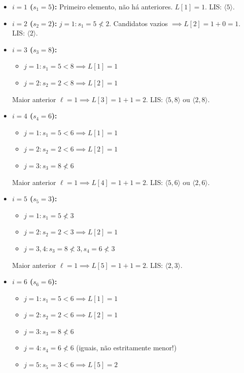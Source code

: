 \documentclass[11pt,a4paper]{article}
\begin{document}
\begin{itemize}
    \item \textbf{$i = 1$ ($s_1 = 5$):} Primeiro elemento, não há anteriores. $L[1] = 1$. LIS: $\langle 5 \rangle$.
    \item \textbf{$i = 2$ ($s_2 = 2$):}
    $j=1: s_1=5 \not< 2$. Candidatos vazios $\implies L[2] = 1 + 0 = 1$. LIS: $\langle 2 \rangle$.
    \item \textbf{$i = 3$ ($s_3 = 8$):}
    \begin{itemize}
        \item $j=1: s_1=5 < 8 \implies L[1] = 1$
        \item $j=2: s_2=2 < 8 \implies L[2] = 1$
    \end{itemize}
    Maior anterior $\ell = 1 \implies L[3] = 1 + 1 = 2$. LIS: $\langle 5, 8 \rangle$ ou $\langle 2, 8 \rangle$.
    \item \textbf{$i = 4$ ($s_4 = 6$):}
    \begin{itemize}
        \item $j=1: s_1=5 < 6 \implies L[1] = 1$
        \item $j=2: s_2=2 < 6 \implies L[2] = 1$
        \item $j=3: s_3=8 \not< 6$
    \end{itemize}
    Maior anterior $\ell = 1 \implies L[4] = 1 + 1 = 2$. LIS: $\langle 5, 6 \rangle$ ou $\langle 2, 6 \rangle$.
    \item \textbf{$i = 5$ ($s_5 = 3$):}
    \begin{itemize}
        \item $j=1: s_1=5 \not< 3$
        \item $j=2: s_2=2 < 3 \implies L[2] = 1$
        \item $j=3, 4: s_3=8 \not< 3, s_4=6 \not< 3$
    \end{itemize}
    Maior anterior $\ell = 1 \implies L[5] = 1 + 1 = 2$. LIS: $\langle 2, 3 \rangle$.
    \item \textbf{$i = 6$ ($s_6 = 6$):}
    \begin{itemize}
        \item $j=1: s_1=5 < 6 \implies L[1] = 1$
        \item $j=2: s_2=2 < 6 \implies L[2] = 1$
        \item $j=3: s_3=8 \not< 6$
        \item $j=4: s_4=6 \not< 6$ (iguais, não estritamente menor!)
        \item $j=5: s_5=3 < 6 \implies L[5] = 2$
    \end{itemize}

\end{itemize}
\end{document}

